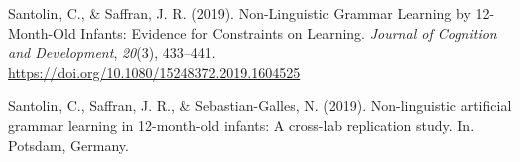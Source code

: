 \documentclass[english,man,man,floatsintext]{apa6}
\begin{document}
\begin{appendix}
\leavevmode\hypertarget{ref-santolin2019}{}%
Santolin, C., \& Saffran, J. R. (2019). Non-Linguistic Grammar Learning
by 12-Month-Old Infants: Evidence for Constraints on Learning.
\emph{Journal of Cognition and Development}, \emph{20}(3), 433--441.
\url{https://doi.org/10.1080/15248372.2019.1604525}

\leavevmode\hypertarget{ref-santolin2019a}{}%
Santolin, C., Saffran, J. R., \& Sebastian-Galles, N. (2019).
Non-linguistic artificial grammar learning in 12-month-old infants: A
cross-lab replication study. In. Potsdam, Germany.

\endgroup
\end{appendix}
\end{document}
